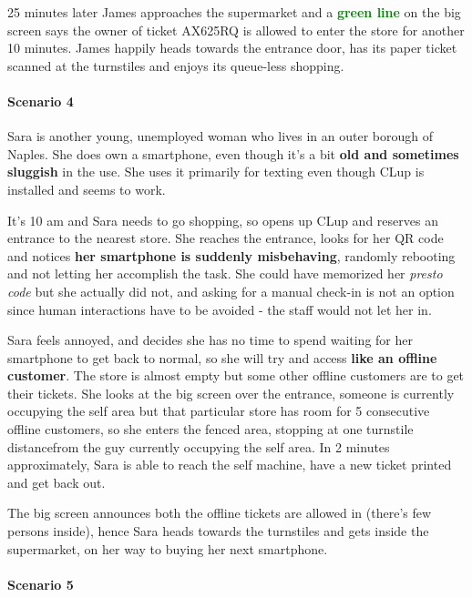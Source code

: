25 minutes later James approaches the supermarket and a \textbf{\textcolor{green} {green line}} on the big screen says the owner of ticket AX625RQ is allowed to enter the store for another 10 minutes. 
\newline James happily heads towards the entrance door, has its paper ticket scanned at the turnstiles and enjoys its queue-less shopping.

\paragraph{Scenario 4}
Sara is another young, unemployed woman who lives in an outer borough of Naples. She does own a smartphone, even though it's a bit \textbf{old and sometimes sluggish} in the use. She uses it primarily for texting even though CLup is installed and seems to work.

It's 10 am and Sara needs to go shopping, so opens up CLup and reserves an entrance to the nearest store. She reaches the entrance, looks for her QR code and notices \textbf{her smartphone is suddenly misbehaving}, randomly rebooting and not letting her accomplish the task. \newline
She could have memorized her \textit{presto code} but she actually did not, and asking for a manual check-in is not an option since human interactions have to be avoided - the staff would not let her in.

Sara feels annoyed, and decides she has no time to spend waiting for her smartphone to get back to normal, so she will try and access \textbf{like an offline customer}. The store is almost empty but some other offline customers are to get their tickets. \newline
She looks at the big screen over the entrance, someone is currently occupying the self area but that particular store has room for 5 consecutive offline customers, so she enters the fenced area, stopping at \guillemotleft one turnstile distance\guillemotright \space from the guy currently occupying the self area. In 2 minutes approximately, Sara is able to reach the self machine, have a new ticket printed and get back out.

The big screen announces both the offline tickets are allowed in (there's few persons inside), hence Sara heads towards the turnstiles and gets inside the supermarket, on her way to buying her next smartphone.


\paragraph{Scenario 5}

